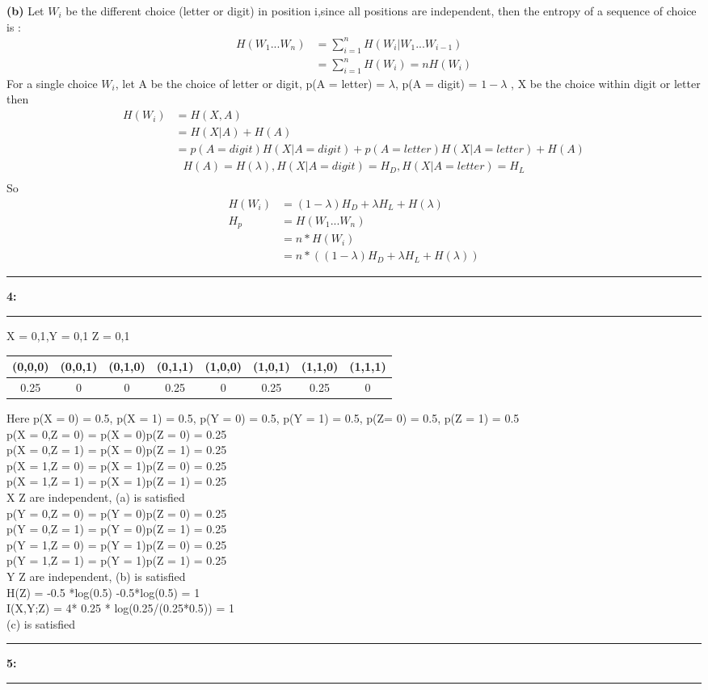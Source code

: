 \documentclass[11pt]{article}
\newcommand\question[2]{\vspace{.25in}\hrule\textbf{#1: #2}\vspace{.5em}\hrule\vspace{.10in}}
\renewcommand\part[1]{\vspace{.20in}\textbf{(#1)}}
\begin{document}
\part{b}
Let $W_{i}$ be the different choice (letter or digit) in position i,since all positions are independent, then the entropy of a sequence of choice is : \\
\begin{align*}
H(W_{1}...W_{n}) &= \sum_{i=1}^{n}H(W_{i}|W_{1}...W_{i-1})\\
&=\sum_{i=1}^{n}H(W_{i}) = nH(W_{i})
\end{align*}
For a single choice $W_{i}$, let A be the choice of letter or digit, p(A = letter) = $\lambda$, p(A = digit) = $1-\lambda$ , X be the choice within digit or letter then\\
\begin{align*}
	H(W_{i}) &= H(X,A)
	\\&= H(X|A) + H(A)
	\\&= p(A = digit)H(X|A = digit) +p(A = letter)H(X|A = letter) + H(A)
\end{align*}
\begin{align*}
H(A) = H(\lambda),H(X|A = digit) = H_{D},H(X|A = letter) = H_{L}\\
\end{align*}
So
\begin{align*}
H(W_{i}) &= (1-\lambda)H_{D} + \lambda H_{L} + H(\lambda)\\
H_{p} &= H(W_{1}...W_{n})\\ &= n * H(W_{i})\\ &= n*((1-\lambda)H_{D} + \lambda H_{L} + H(\lambda))
\end{align*}
\question{4}{}
X = {0,1},Y = {0,1} Z = {0,1}
\begin{center}
	\begin{tabular}{c|c|c|c|c|c|c|c}
  (0,0,0) & (0,0,1)& (0,1,0)& (0,1,1)& (1,0,0)& (1,0,1)&  (1,1,0)& (1,1,1)\\
  \hline
   0.25& 0 & 0 &0.25& 0& 0.25& 0.25& 0\\ 
\end{tabular}
\end{center}
Here p(X = 0) = 0.5, p(X = 1) = 0.5, p(Y = 0) = 0.5, p(Y = 1) = 0.5, p(Z= 0) = 0.5, p(Z = 1) = 0.5\\
p(X = 0,Z = 0) = p(X = 0)p(Z = 0) = 0.25\\
p(X = 0,Z = 1) = p(X = 0)p(Z = 1) = 0.25\\
p(X = 1,Z = 0) = p(X = 1)p(Z = 0) = 0.25\\
p(X = 1,Z = 1) = p(X = 1)p(Z = 1) = 0.25\\
X Z are independent, (a) is satisfied\\
p(Y = 0,Z = 0) = p(Y = 0)p(Z = 0) = 0.25\\
p(Y = 0,Z = 1) = p(Y = 0)p(Z = 1) = 0.25\\
p(Y = 1,Z = 0) = p(Y = 1)p(Z = 0) = 0.25\\
p(Y = 1,Z = 1) = p(Y = 1)p(Z = 1) = 0.25\\
Y Z are independent, (b) is satisfied\\
H(Z) = -0.5 *log(0.5) -0.5*log(0.5) = 1\\
I(X,Y;Z) = 4* 0.25 * log(0.25/(0.25*0.5)) = 1\\
(c) is satisfied
\question{5}{}
\end{document}
